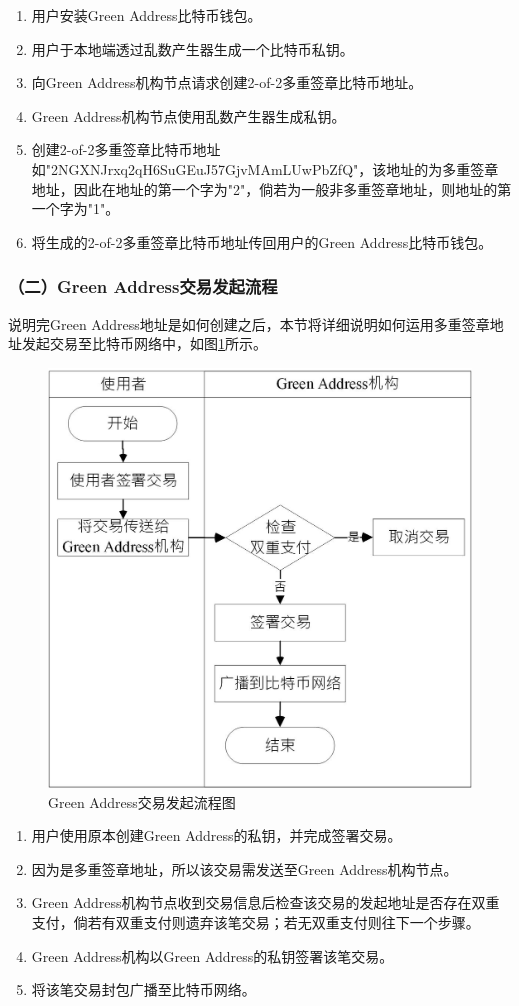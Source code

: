 			 	\begin{enumerate}
			 		\item 用户安装Green Address比特币钱包。
			 		\item 用户于本地端透过乱数产生器生成一个比特币私钥。
			 		\item 向Green Address机构节点请求创建2-of-2多重签章比特币地址。
			 		\item Green Address机构节点使用乱数产生器生成私钥。
					\item 创建2-of-2多重签章比特币地址如"2NGXNJrxq2qH6SuGEuJ57GjvMAmLUwPbZfQ"，该地址的为多重签章地址，因此在地址的第一个字为"2"，倘若为一般非多重签章地址，则地址的第一个字为"1"。
					\item 将生成的2-of-2多重签章比特币地址传回用户的Green Address比特币钱包。
			 	\end{enumerate}

			 	\subsubsection{（二）Green Address交易发起流程}
			 	说明完Green Address地址是如何创建之后，本节将详细说明如何运用多重签章地址发起交易至比特币网络中，如图\ref{gatx}所示。

			 	\begin{figure}[!htbp]
					\centering
					\includegraphics[width = .5\textwidth]{gatx.jpg}
					\caption{Green Address交易发起流程图}\label{gatx}
				\end{figure}

				\begin{enumerate}
					\item 用户使用原本创建Green Address的私钥，并完成签署交易。
					\item 因为是多重签章地址，所以该交易需发送至Green Address机构节点。
					\item Green Address机构节点收到交易信息后检查该交易的发起地址是否存在双重支付，倘若有双重支付则遗弃该笔交易；若无双重支付则往下一个步骤。
					\item Green Address机构以Green Address的私钥签署该笔交易。
					\item 将该笔交易封包广播至比特币网络。
				\end{enumerate}


